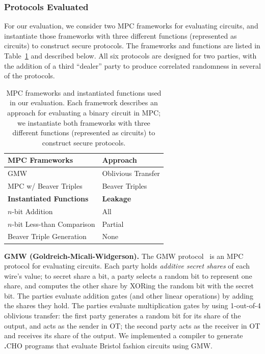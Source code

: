 \documentclass[compsoc, conference, a4paper, 10pt, times]{IEEEtran}
\renewcommand{\paragraph}[1]{\vspace*{2pt}\noindent\textbf{#1}}
\newcommand{\langname}{\textsc{\textbf{.}CHO}\xspace}
\begin{document}
\subsubsection{Protocols Evaluated}
\label{sec:protocols-evaluated}

For our evaluation, we consider two MPC frameworks for evaluating circuits, and instantiate those frameworks with three different functions (represented as circuits) to construct secure protocols. The frameworks and functions are listed in Table~\ref{tbl:protocols} and described below.
All six protocols are designed for two parties, with the addition of a third ``dealer'' party to produce correlated randomness in several of the protocols.

\begin{table}
  \centering
  \renewcommand*{\arraystretch}{1.2}
  \begin{tabular}{|l l|}
    \hline
    \textbf{MPC Frameworks} & \textbf{Approach} \\
    \hline
    GMW~\cite{goldreich2019play, goldreich2009foundations} & Oblivious Transfer\\
    MPC w/ Beaver Triples~\cite{beaver1992efficient} & Beaver Triples\\[4pt]
    \hline
    \textbf{Instantiated Functions} & \textbf{Leakage}\\
    \hline
    $n$-bit Addition & All \\
    $n$-bit Less-than Comparison & Partial \\
    Beaver Triple Generation & None \\
    \hline
  \end{tabular}
  \bigskip
  \caption{MPC frameworks and instantiated functions used in our evaluation. Each framework describes an approach for evaluating a binary circuit in MPC; we instantiate both frameworks with three different functions (represented as circuits) to construct secure protocols. }
  \label{tbl:protocols}
\end{table}

\paragraph{GMW (Goldreich-Micali-Widgerson).}
The GMW protocol~\cite{goldreich2019play, goldreich2009foundations} is an MPC protocol for evaluating circuits. Each party holds \emph{additive secret shares} of each wire's value; to secret share a bit, a party selects a random bit to represent one share, and computes the other share by XORing the random bit with the secret bit.
%
The parties evaluate addition gates (and other linear operations) by adding the shares they hold.
%
The parties evaluate multiplication gates by using 1-out-of-4 oblivious transfer: the first party generates a random bit for its share of the output, and acts as the sender in OT; the second party acts as the receiver in OT and receives its share of the output. We implemented a compiler to generate \langname programs that evaluate Bristol fashion circuits using GMW.
\end{document}
